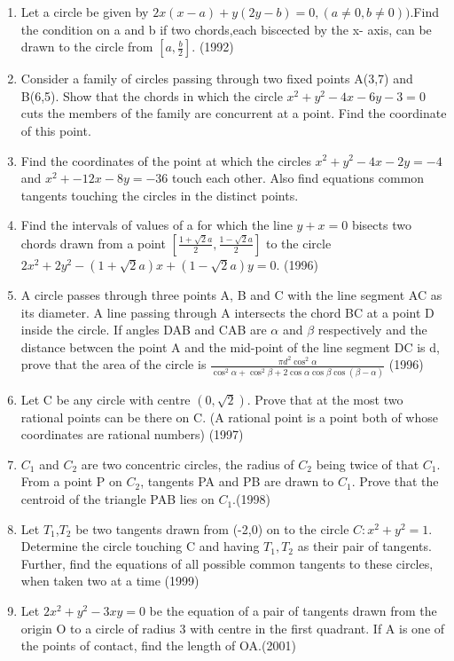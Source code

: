 \documentclass[12pt]{article}
\providecommand{\sbrak}[1]{\ensuremath{{}\left[#1\right]}}
\begin{document}
\begin{enumerate}
\item Let a circle be given by $2x(x-a)+y(2y-b)=0,(a\neq 0,b\neq 0))$.Find the condition on a and b if two chords,each biscected by the x- axis, can be drawn to the circle from $\sbrak{a,\frac{b}{2}}$. (1992)
\item Consider a family of circles passing through two fixed points A(3,7) and B(6,5). Show that the chords in which the circle $x^2+y^2-4x-6y-3=0$ cuts the members of the family are concurrent at a point. Find the coordinate of this point.
\item Find the coordinates of the point at which the circles $x^2+y^2-4x-2y=-4$ and $x^2+-12x-8y=-36$ touch each other. Also find equations common tangents touching the
circles in the distinct points.
\item Find the intervals of values of a for which the line $y+x=0$ bisects two chords drawn from a point  $\sbrak{\frac{1+\sqrt{2}a}{2},\frac{1-\sqrt{2}a}{2}}$ to the circle $2x^2+2y^2-(1+\sqrt{2}a)x+(1-\sqrt{2}a)y=0$. (1996)
\item A circle passes through three points A, B and C with the line segment AC as its diameter. A line passing through A intersects the chord BC at a point D inside the circle. If angles DAB and CAB are $\alpha$ and $\beta$ respectively and the distance betwcen the point A and the mid-point of the line segment DC is d, prove that the area of the circle is $\frac{\pi d^2 \cos^2 \alpha}{\cos^2\alpha+\cos^2\beta+ 2\cos\alpha\cos\beta\cos(\beta-\alpha)}$ (1996)
\item Let C be any circle with centre $(0,\sqrt{2})$. Prove that at the most two rational points can be there on C. (A rational point is a point both of whose coordinates are rational numbers) (1997)
\item $C_1$ and $C_2$ are two concentric circles, the radius of $C_2$  being twice of that $C_1$. From a point P on $C_2$, tangents PA and PB are drawn to $C_1$. Prove that the centroid of the triangle PAB lies on $C_1$.(1998)
\item Let $T_1$,$T_2$ be two tangents drawn from (-2,0) on to the circle $C:x^2+y^2=1$. Determine the circle touching C and having $T_1,T_2$ as their pair of tangents. Further, find the equations of all possible common tangents to these circles, when taken two at a  time (1999)
\item Let $2x^2+y^2-3xy=0$ be the equation of a pair of tangents drawn from the origin O to a circle of radius 3 with centre in the first quadrant. If A is one of the points of contact, find the length of OA.(2001)

\end{enumerate}
\end{document}
